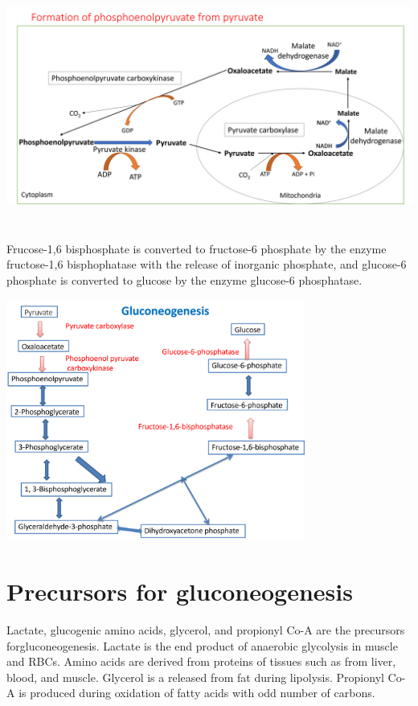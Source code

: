 \documentclass[
]{book}
\begin{document}
\includegraphics[width=\textwidth,height=3.125in]{Images/pep.png}

Frucose-1,6 bisphosphate is converted to fructose-6 phosphate by the enzyme fructose-1,6 bisphophatase with the release of inorganic phosphate, and glucose-6 phosphate is converted to glucose by the enzyme glucose-6 phosphatase.

\includegraphics[width=\textwidth,height=3.125in]{Images/gluconeogenesis.png}

\section{Precursors for gluconeogenesis}\label{precursors-for-gluconeogenesis}

Lactate, glucogenic amino acids, glycerol, and propionyl Co-A are the precursors forgluconeogenesis. Lactate is the end product of anaerobic glycolysis in muscle and RBCs. Amino acids are derived from proteins of tissues such as from liver, blood, and muscle. Glycerol is a released from fat during lipolysis. Propionyl Co-A is produced during oxidation of fatty acids with odd number of carbons.
\end{document}
